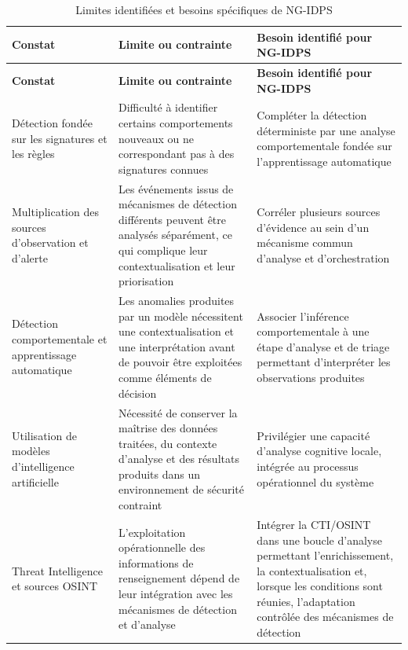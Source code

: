 
\renewcommand{\arraystretch}{1.5}
\begin{xltabular}{\textwidth}{|>{\raggedright\arraybackslash}X|>{\raggedright\arraybackslash}X|>{\raggedright\arraybackslash}X|}

\caption{Limites identifiées et besoins spécifiques de NG-IDPS}
\label{tab:besoins_ngidps} \\

\hline
{}
\textbf{Constat} &
\textbf{Limite ou contrainte} &
\textbf{Besoin identifié pour NG-IDPS} \\ \hline
\endfirsthead

\hline
{}
\textbf{Constat} &
\textbf{Limite ou contrainte} &
\textbf{Besoin identifié pour NG-IDPS} \\ \hline
\endhead

Détection fondée sur les signatures et les règles &
Difficulté à identifier certains comportements nouveaux ou ne correspondant pas à des signatures connues &
Compléter la détection déterministe par une analyse comportementale fondée sur l'apprentissage automatique \\ \hline

Multiplication des sources d'observation et d'alerte &
Les événements issus de mécanismes de détection différents peuvent être analysés séparément, ce qui complique leur contextualisation et leur priorisation &
Corréler plusieurs sources d'évidence au sein d'un mécanisme commun d'analyse et d'orchestration \\ \hline

Détection comportementale et apprentissage automatique &
Les anomalies produites par un modèle nécessitent une contextualisation et une interprétation avant de pouvoir être exploitées comme éléments de décision &
Associer l'inférence comportementale à une étape d'analyse et de triage permettant d'interpréter les observations produites \\ \hline

Utilisation de modèles d'intelligence artificielle &
Nécessité de conserver la maîtrise des données traitées, du contexte d'analyse et des résultats produits dans un environnement de sécurité contraint &
Privilégier une capacité d'analyse cognitive locale, intégrée au processus opérationnel du système \\ \hline

Threat Intelligence et sources OSINT &
L'exploitation opérationnelle des informations de renseignement dépend de leur intégration avec les mécanismes de détection et d'analyse &
Intégrer la CTI/OSINT dans une boucle d'analyse permettant l'enrichissement, la contextualisation et, lorsque les conditions sont réunies, l'adaptation contrôlée des mécanismes de détection \\ \hline


\end{xltabular}
